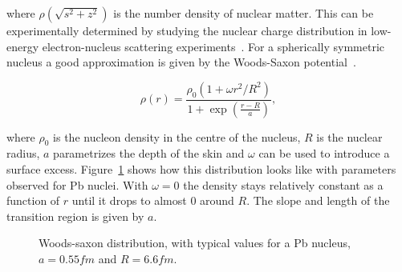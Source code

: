 \noindent where $ \rho\left(\sqrt{s^2+z^2}\right)$ is the number density of nuclear matter. This can be experimentally determined by studying the nuclear charge distribution in low-energy electron-nucleus scattering experiments~\cite{Miller:2007ri,DeJager:1987qc}. For a spherically symmetric nucleus a good approximation is given by the Woods-Saxon potential~\cite{Abelev:2013qoq}. 

\begin{equation}
\rho\left( r\right) = \frac{\rho_0 \left(1+\omega r^2 / R^2\right)}{1+\exp \left(\frac{r-R}{a}\right)},
\end{equation}


\noindent where $\rho_0$ is the nucleon density in the centre of the nucleus, $R$ is the nuclear radius, $a$ parametrizes the depth of the skin and $\omega$ can be used to introduce a surface excess. Figure~\ref{fig:woodssaxon} shows how this distribution looks like with parameters observed for Pb nuclei. With $\omega=0$ the density stays relatively constant as a function of $r$ until it drops to almost 0 around $R$. The slope and length of the transition region is given by $a$. 

\begin{figure}
\centering
{}
\caption{Woods-saxon distribution, with typical values for a Pb nucleus, $a=0.55\unit{fm}$ and $R=6.6\unit{fm}$.}
\label{fig:woodssaxon}
\end{figure}


